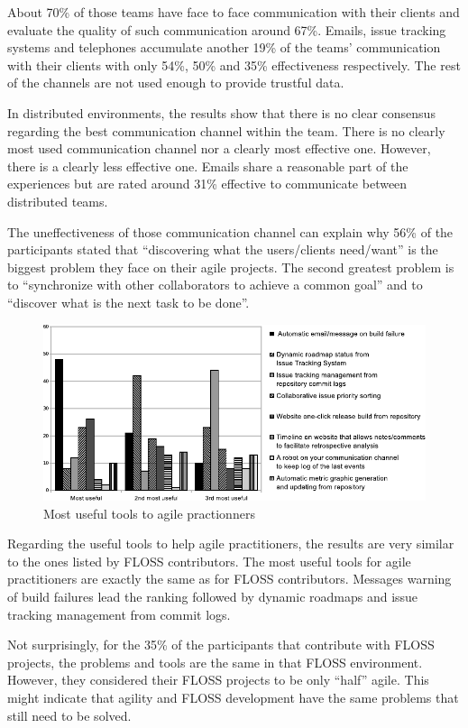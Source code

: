 \documentclass[lnbip]{svmultln}
\begin{document}
About 70\% of those teams have face to face communication with their
clients and evaluate the quality of such communication around
67\%. Emails, issue tracking systems and telephones accumulate another
19\% of the teams' communication with their clients with only 54\%,
50\% and 35\% effectiveness respectively. The rest of the channels are
not used enough to provide trustful data.

In distributed environments, the results show that there is no clear
consensus regarding the best communication channel within the
team. There is no clearly most used communication channel nor a
clearly most effective one. However, there is a clearly less effective
one. Emails share a reasonable part of the experiences but are rated
around 31\% effective to communicate between distributed teams.

The uneffectiveness of those communication channel can explain why
56\% of the participants stated that ``discovering what the
users/clients need/want'' is the biggest problem they face on their
agile projects. The second greatest problem is to ``synchronize with
other collaborators to achieve a common goal'' and to ``discover what
is the next task to be done''.

\begin{figure}[hbt]
  \centering
  \includegraphics[scale=.9]{agile-tools.pdf}
  \caption{Most useful tools to agile practionners}
  \label{fig:agile-tools}
\end{figure}

Regarding the useful tools to help agile practitioners, the results
are very similar to the ones listed by FLOSS contributors. The most
useful tools for agile practitioners are exactly the same as for FLOSS
contributors. Messages warning of build failures lead the ranking
followed by dynamic roadmaps and issue tracking management from commit
logs.

Not surprisingly, for the 35\% of the participants that contribute
with FLOSS projects, the problems and tools are the same in that FLOSS
environment. However, they considered their FLOSS projects to be only
``half'' agile. This might indicate that agility and FLOSS development
have the same problems that still need to be solved.
\end{document}
